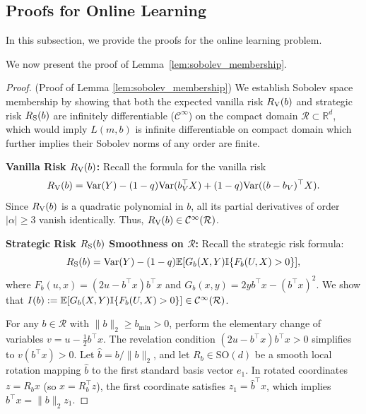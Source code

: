 \subsection{Proofs for Online Learning}

In this subsection, we provide the proofs for the online learning problem.

We now present the proof of Lemma~\ref{lem:sobolev_membership}.

\begin{proof}(Proof of Lemma \ref{lem:sobolev_membership})\label{proof:sobolev_membership}\label{app:proof_sobolev_membership}
We establish Sobolev space membership by showing that both the expected vanilla risk $R_{\mathrm{V}}(b)$ and strategic risk $R_{\mathrm{S}}(b)$ are infinitely differentiable ($\mathcal{C}^\infty$) on the compact domain $\mathcal{R} \subset \mathbb{R}^d$, which would imply $L(m,b)$ is infinite differentiable on compact domain which further implies their Sobolev norms of any order are finite.

\noindent\textbf{Vanilla Risk $R_{\mathrm{V}}(b)$:}
Recall the formula for the vanilla risk
\begin{equation*}
    R_{\mathrm{V}}(b) = \mathrm{Var}(Y) - (1-q)\mathrm{Var}(b_V^\top X) + (1-q)\mathrm{Var}((b-b_V)^\top X).
\end{equation*}
Since $R_{\mathrm{V}}(b)$ is a quadratic polynomial in $b$, all its partial derivatives of order $|\alpha| \ge 3$ vanish identically. Thus, $R_{\mathrm{V}}(b) \in \mathcal{C}^\infty(\mathcal{R})$.

\noindent\textbf{Strategic Risk $R_{\mathrm{S}}(b)$ Smoothness on $\mathcal{R}$:}
Recall the strategic risk formula:
\begin{equation*}
    R_{\mathrm{S}}(b) = \mathrm{Var}(Y) - (1-q)\mathbb{E}[G_b(X, Y)\mathbb{I}\{F_b(U, X) > 0\}],
\end{equation*}
where $F_b(u, x) = (2u - b^\top x) b^\top x$ and $G_b(x, y) = 2y b^\top x - (b^\top x)^2$. We show that $I(b) := \mathbb{E}[G_b(X, Y)\mathbb{I}\{F_b(U, X) > 0\}] \in \mathcal{C}^\infty(\mathcal{R})$.

For any $b \in \mathcal{R}$ with $\|b\|_2 \ge b_{\min} > 0$, perform the elementary change of variables $v = u - \frac{1}{2}b^\top x$. The revelation condition $(2u - b^\top x)b^\top x > 0$ simplifies to $v(b^\top x) > 0$. Let $\hat{b} = b / \|b\|_2$, and let $R_b \in \mathrm{SO}(d)$ be a smooth local rotation mapping $\hat{b}$ to the first standard basis vector $e_1$. In rotated coordinates $z = R_b x$ (so $x = R_b^\top z$), the first coordinate satisfies $z_1 = \hat{b}^\top x$, which implies $b^\top x = \|b\|_2 z_1$.


\end{proof}
